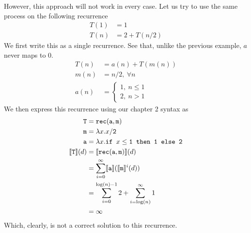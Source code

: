 However, this approach will not work in every case. Let us try to use the same process on the following recurrence
\begin{align*}
T(1) &= 1 \\
T(n) &= 2 + T(n/2) 
\end{align*}
We first write this as a single recurrence. See that, unlike the previous example, $a$ never maps to $0$.
\begin{align*}
T(n) &= a(n) + T(m(n)) \\
m(n) &= n/2, \ \forall n \\ 
a(n) &= 
\begin{cases}
1, \ n \leq 1 \\
2, \ n > 1
\end{cases}
\end{align*}
We then express this recurrence using our chapter 2 syntax as
\begin{align*}
\texttt{T} &= \texttt{rec}(\texttt{a},\texttt{m}) \\
\texttt{m} &= \lambda x.x/\texttt{2} \\
\texttt{a} &=\lambda x.\texttt{if } x\leq\texttt{1} \texttt{ then } \texttt{1} \texttt{ else } \texttt{2} \\
\llbracket \texttt{T} \rrbracket(d) &= \llbracket \texttt{rec}(\texttt{a},\texttt{m}) \rrbracket(d) \\
&= \sum_{i=0}^{\infty}\llbracket \texttt{a} \rrbracket(\llbracket \texttt{m}\rrbracket^i(d)) \\
&= \sum_{i=0}^{\log(n)-1} 2 + \sum_{i=\log(n) }^{\infty} 1 \\
&= \infty
\end{align*}
Which, clearly, is not a correct solution to this recurrence.

